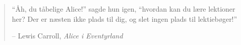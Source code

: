 \newpage \vspace*{8cm}
\thispagestyle{empty}
\begin{quotation}
\begin{center}
  \large
  \enquote{Åh, du tåbelige Alice!} sagde hun igen, \enquote{hvordan kan du lære 
  lektioner her? Der er næsten ikke plads til dig, og slet ingen plads til 
  lektiebøger!}
\end{center}
\begin{flushright} -- Lewis Carroll, 
  \textit{Alice i Eventyrland}\end{flushright}
\end{quotation}
